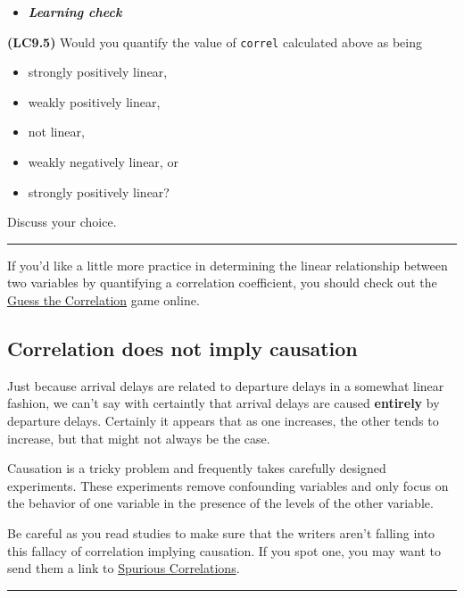 \documentclass[]{tufte-book}
\let\oldrule=\rule
\renewcommand{\rule}[1]{\oldrule{\linewidth}}
\providecommand{\tightlist}{%
  \setlength{\itemsep}{0pt}\setlength{\parskip}{0pt}}
\newenvironment{rmdblock}[1]
  {\begin{shaded*}
  \begin{itemize}
  \renewcommand{\labelitemi}{
    \raisebox{-.7\height}[0pt][0pt]{
    }
  }
  \item
  }
  {
  \end{itemize}
  \end{shaded*}
  }
\newenvironment{learncheck}
  {\begin{rmdblock}{warning}}
  {\end{rmdblock}}
\begin{document}
\begin{learncheck}
\textbf{\emph{Learning check}}
\end{learncheck}

\textbf{(LC9.5)} Would you quantify the value of \texttt{correl}
calculated above as being

\begin{itemize}
\tightlist
\item
  strongly positively linear,
\item
  weakly positively linear,
\item
  not linear,
\item
  weakly negatively linear, or
\item
  strongly positively linear?
\end{itemize}

Discuss your choice.

\begin{center}\rule{0.5\linewidth}{\linethickness}\end{center}

If you'd like a little more practice in determining the linear
relationship between two variables by quantifying a correlation
coefficient, you should check out the
\href{http://guessthecorrelation.com/}{Guess the Correlation} game
online.

\subsection{Correlation does not imply
causation}\label{correlation-does-not-imply-causation}

Just because arrival delays are related to departure delays in a
somewhat linear fashion, we can't say with certaintly that arrival
delays are caused \textbf{entirely} by departure delays. Certainly it
appears that as one increases, the other tends to increase, but that
might not always be the case.

Causation is a tricky problem and frequently takes carefully designed
experiments. These experiments remove confounding variables and only
focus on the behavior of one variable in the presence of the levels of
the other variable.

Be careful as you read studies to make sure that the writers aren't
falling into this fallacy of correlation implying causation. If you spot
one, you may want to send them a link to
\href{http://www.tylervigen.com/spurious-correlations}{Spurious
Correlations}.

\begin{center}\rule{0.5\linewidth}{\linethickness}\end{center}
\end{document}
